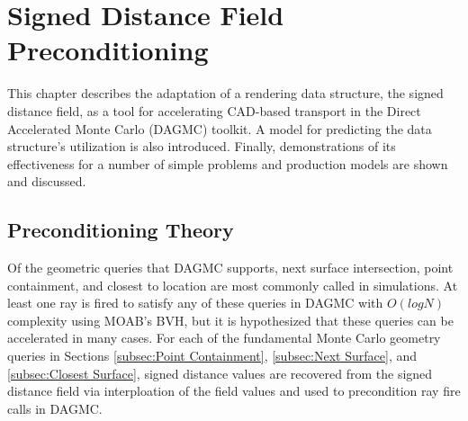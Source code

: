 

\newcommand{\precondQuery}[4] {
  \null %
  \subsection{#1}\label{subsec:#1}
  \begin{adjustwidth}{1em}{0pt}
    \begin{figure}[h]
      \begin{center}
        {width=0.65\textwidth}
        \caption{#3}
        \label{fig:#2}
      \end{center}
    \end{figure}
    #4
  \end{adjustwidth}
}

\newcommand{\sdfModel}[2] {
  \null %
  \textbf{\uppercase{#1}} 
  \begin{adjustwidth}{2.5em}{0pt}
    #2
  \end{adjustwidth}
  \null
}

\chapter{Signed Distance Field Preconditioning}\label{ch:preconditioning}

This chapter describes the adaptation of a rendering data structure, the signed
distance field, as a tool for accelerating CAD-based transport in the Direct
Accelerated Monte Carlo (DAGMC) toolkit. A model for predicting the data
structure's utilization is also introduced. Finally, demonstrations of its
effectiveness for a number of simple problems and production models are shown
and discussed.

\section{Preconditioning Theory}\label{section:preconditioner_theory}

Of the geometric queries that DAGMC supports, next surface intersection, point
containment, and closest to location are most commonly called in simulations.
At least one ray is fired to satisfy any of these queries in DAGMC with
$O(logN)$ complexity using MOAB's BVH, but it is hypothesized that these queries
can be accelerated in many cases. For each of the fundamental Monte Carlo
geometry queries in Sections \ref{subsec:Point Containment}, \ref{subsec:Next
  Surface}, and \ref{subsec:Closest Surface}, signed distance values are
recovered from the signed distance field via interploation of the field values
and used to precondition ray fire calls in DAGMC.



